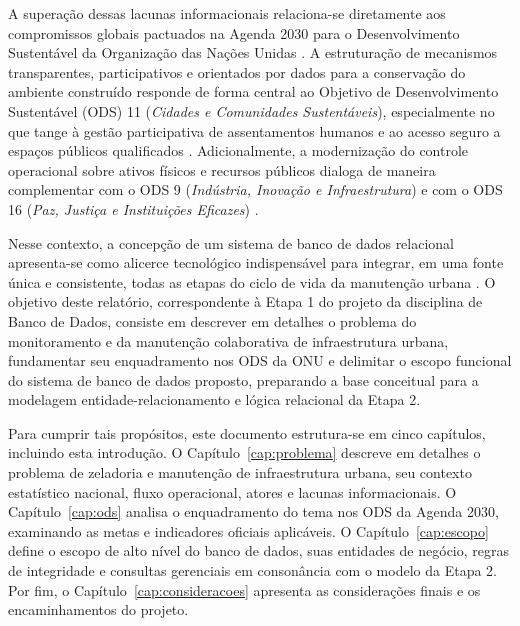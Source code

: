A superação dessas lacunas informacionais relaciona-se diretamente aos compromissos globais pactuados na Agenda 2030 para o Desenvolvimento Sustentável da Organização das Nações Unidas \cite{onu2015agenda2030}. A estruturação de mecanismos transparentes, participativos e orientados por dados para a conservação do ambiente construído responde de forma central ao Objetivo de Desenvolvimento Sustentável (ODS) 11 (\emph{Cidades e Comunidades Sustentáveis}), especialmente no que tange à gestão participativa de assentamentos humanos e ao acesso seguro a espaços públicos qualificados \cite{onubrasil2015ods11, ipea2019ods11}. Adicionalmente, a modernização do controle operacional sobre ativos físicos e recursos públicos dialoga de maneira complementar com o ODS 9 (\emph{Indústria, Inovação e Infraestrutura}) e com o ODS 16 (\emph{Paz, Justiça e Instituições Eficazes}) \cite{onubrasil2015ods9, onubrasil2015ods16}.

Nesse contexto, a concepção de um sistema de banco de dados relacional apresenta-se como alicerce tecnológico indispensável para integrar, em uma fonte única e consistente, todas as etapas do ciclo de vida da manutenção urbana \cite{elmasri2019sistemas, heuser2009projeto}. O objetivo deste relatório, correspondente à Etapa 1 do projeto da disciplina de Banco de Dados, consiste em descrever em detalhes o problema do monitoramento e da manutenção colaborativa de infraestrutura urbana, fundamentar seu enquadramento nos ODS da ONU e delimitar o escopo funcional do sistema de banco de dados proposto, preparando a base conceitual para a modelagem entidade-relacionamento e lógica relacional da Etapa 2.

Para cumprir tais propósitos, este documento estrutura-se em cinco capítulos, incluindo esta introdução. O Capítulo~\ref{cap:problema} descreve em detalhes o problema de zeladoria e manutenção de infraestrutura urbana, seu contexto estatístico nacional, fluxo operacional, atores e lacunas informacionais. O Capítulo~\ref{cap:ods} analisa o enquadramento do tema nos ODS da Agenda 2030, examinando as metas e indicadores oficiais aplicáveis. O Capítulo~\ref{cap:escopo} define o escopo de alto nível do banco de dados, suas entidades de negócio, regras de integridade e consultas gerenciais em consonância com o modelo da Etapa 2. Por fim, o Capítulo~\ref{cap:consideracoes} apresenta as considerações finais e os encaminhamentos do projeto.
